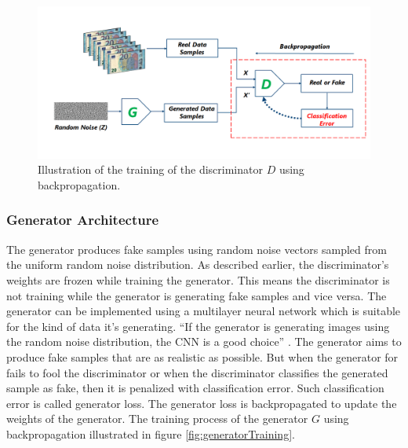 \begin{figure}[H]
        \begin{center}
	    \includegraphics[scale=0.45]{images/Fundamentals/discriminatorTraining.png}
	    \caption[Illustration of the training of the discriminator $D$ using backpropagation.]{Illustration of the training of the discriminator $D$ using backpropagation.}
	    \label{fig:discriminatorTraining}
	    \end{center}
\end{figure}

\subsubsection{Generator Architecture}\label{TheGeneratorSubSection}


The generator produces fake samples using random noise vectors sampled from the uniform random noise distribution. As described earlier, the discriminator's weights are frozen while training the generator. This means the discriminator is not training while the generator is generating fake samples and vice versa. The generator can be implemented using a multilayer neural network which is suitable for the kind of data it's generating. ``If the generator is generating images using the random noise distribution, the \ac{CNN} is a good choice'' \cite{radford2016unsupervised}. The generator aims to produce fake samples that are as realistic as possible. But when the generator for fails to fool the discriminator or when the discriminator classifies the generated sample as fake, then it is penalized with classification error. Such classification error is called generator loss. The generator loss is backpropagated to update the weights of the generator. The training process of the generator $G$ using backpropagation illustrated in figure \ref{fig:generatorTraining}.


